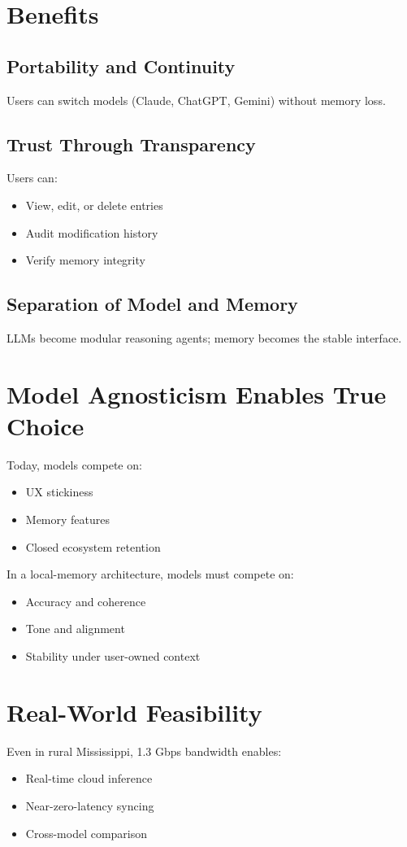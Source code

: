 \documentclass[11pt]{article}
\begin{document}
\section{Benefits}

\subsection{Portability and Continuity}
Users can switch models (Claude, ChatGPT, Gemini) without memory loss.

\subsection{Trust Through Transparency}
Users can:
\begin{itemize}[nosep]
    \item View, edit, or delete entries
    \item Audit modification history
    \item Verify memory integrity
\end{itemize}

\subsection{Separation of Model and Memory}
LLMs become modular reasoning agents; memory becomes the stable interface.

\section{Model Agnosticism Enables True Choice}
Today, models compete on:
\begin{itemize}[nosep]
    \item UX stickiness
    \item Memory features
    \item Closed ecosystem retention
\end{itemize}

In a local-memory architecture, models must compete on:
\begin{itemize}[nosep]
    \item Accuracy and coherence
    \item Tone and alignment
    \item Stability under user-owned context
\end{itemize}

\section{Real-World Feasibility}
Even in rural Mississippi, 1.3 Gbps bandwidth enables:
\begin{itemize}[nosep]
    \item Real-time cloud inference
    \item Near-zero-latency syncing
    \item Cross-model comparison
\end{itemize}
\end{document}
